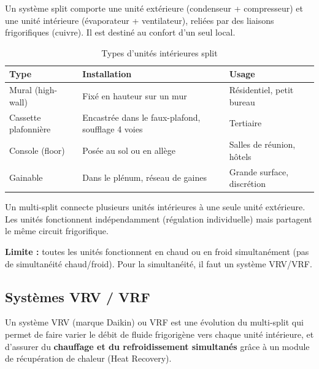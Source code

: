\begin{definition}[title=Système split]
Un système split comporte une unité extérieure (condenseur + compresseur) et une unité intérieure (évaporateur + ventilateur), reliées par des liaisons frigorifiques (cuivre). Il est destiné au confort d'un seul local.
\end{definition}

\begin{table}[H]
  \centering
  \caption{Types d'unités intérieures split}
  \begin{tabular}{p{3cm}p{5cm}p{4cm}}
    \toprule
    Type & Installation & Usage \\
    \midrule
    Mural (high-wall) & Fixé en hauteur sur un mur & Résidentiel, petit bureau \\
    Cassette plafonnière & Encastrée dans le faux-plafond, soufflage 4 voies & Tertiaire \\
    Console (floor) & Posée au sol ou en allège & Salles de réunion, hôtels \\
    Gainable & Dans le plénum, réseau de gaines & Grande surface, discrétion \\
    \bottomrule
  \end{tabular}
\end{table}

\begin{definition}[title=Système multi-split]
Un multi-split connecte plusieurs unités intérieures à une seule unité extérieure. Les unités fonctionnent indépendamment (régulation individuelle) mais partagent le même circuit frigorifique.

\textbf{Limite :} toutes les unités fonctionnent en chaud ou en froid simultanément (pas de simultanéité chaud/froid). Pour la simultanéité, il faut un système VRV/VRF.
\end{definition}

\subsection{Systèmes VRV / VRF}

\begin{definition}[title=VRV / VRF (Volume de Réfrigérant Variable)]
Un système VRV (marque Daikin) ou VRF est une évolution du multi-split qui permet de faire varier le débit de fluide frigorigène vers chaque unité intérieure, et d'assurer du \textbf{chauffage et du refroidissement simultanés} grâce à un module de récupération de chaleur (Heat Recovery).
\end{definition}

